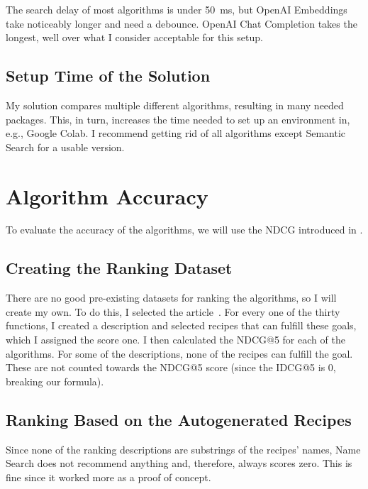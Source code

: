 \documentclass[
     12pt,                    %
     a4paper,             %
     BCOR=10mm,     %
     DIV=14,                 %
     listof=totoc,                    %
     bibliography=totoc,       %
     index=totoc,              %
     twoside,
     headsepline
     ]{scrreprt}
\begin{document}
The search delay of most algorithms is under \SI{50}{\milli\second}, but OpenAI Embeddings take noticeably longer and need a debounce. OpenAI Chat Completion takes the longest, well over what I consider acceptable for this setup.

\subsection{Setup Time of the Solution}

My solution compares multiple different algorithms, resulting in many needed packages. This, in turn, increases the time needed to set up an environment in, e.g., Google Colab. I recommend getting rid of all algorithms except Semantic Search for a usable version.

\section{Algorithm Accuracy}

To evaluate the accuracy of the algorithms, we will use the NDCG introduced in .

\subsection{Creating the Ranking Dataset}

There are no good pre-existing datasets for ranking the algorithms, so I will create my own. To do this, I selected the article~\cite{pandasfunctions}. For every one of the thirty functions, I created a description and selected recipes that can fulfill these goals, which I assigned the score one. I then calculated the NDCG@5 for each of the algorithms. For some of the descriptions, none of the recipes can fulfill the goal. These are not counted towards the NDCG@5 score (since the IDCG@5 is 0, breaking our formula).

\subsection{Ranking Based on the Autogenerated Recipes}

Since none of the ranking descriptions are substrings of the recipes' names, Name Search does not recommend anything and, therefore, always scores zero. This is fine since it worked more as a proof of concept.
\end{document}
